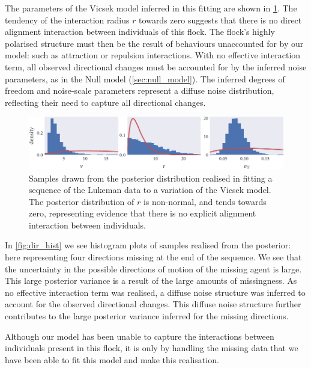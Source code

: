 The parameters of the Vicsek model inferred in this fitting are shown in
\cref{fig:lukeman_params}. The tendency of the interaction radius $r$ towards
zero suggests that there is no direct alignment interaction between individuals
of this flock. The flock's highly polarised structure must then be the result
of behaviours unaccounted for by our model: such as attraction or repulsion
interactions. With no effective interaction term, all observed directional
changes must be accounted for by the inferred noise parameters, as in the Null
model (\cref{sec:null_model}). The inferred degrees of freedom and noise-scale
parameters represent a diffuse noise distribution, reflecting their need to
capture all directional changes.

\begin{figure}[tb]
  \includegraphics{params_hist.pdf}
  \caption{Samples drawn from the posterior distribution realised in fitting a
    sequence of the Lukeman data to a variation of the Vicsek model. The
    posterior distribution of $r$ is non-normal, and tends towards zero,
    representing evidence that there is no explicit alignment interaction
    between individuals.}
  \label{fig:lukeman_params}
\end{figure}

In \cref{fig:dir_hist} we see histogram plots of samples realised from the
posterior: here representing four directions missing at the end of the
sequence. We see that the uncertainty in the possible directions of motion of
the missing agent is large. This large posterior variance is a result of the
large amounts of missingness. As no effective interaction term was realised, a
diffuse noise structure was inferred to account for the observed directional
changes. This diffuse noise structure further contributes to the large
posterior variance inferred for the missing directions.

Although our model has been unable to capture the interactions between
individuals present in this flock, it is only by handling the missing data that
we have been able to fit this model and make this realisation.


